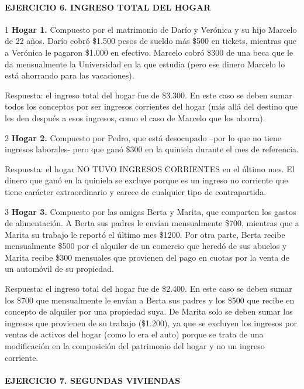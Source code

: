\documentclass[
  openany]{book}
\begin{document}
\hypertarget{ejercicio-6.-ingreso-total-del-hogar-1}{%
\paragraph{\texorpdfstring{\textbf{EJERCICIO 6. INGRESO TOTAL DEL HOGAR}}{EJERCICIO 6. INGRESO TOTAL DEL HOGAR}}\label{ejercicio-6.-ingreso-total-del-hogar-1}}

1 \textbf{Hogar 1.} Compuesto por el matrimonio de Darío y Verónica y su hijo Marcelo de 22 años. Darío cobró \$1.500 pesos de sueldo más \$500 en tickets, mientras que a Verónica le pagaron \$1.000 en efectivo. Marcelo cobró \$300 de una beca que le da mensualmente la Universidad en la que estudia (pero ese dinero Marcelo lo está ahorrando para las vacaciones).

Respuesta: el ingreso total del hogar fue de \$3.300. En este caso se deben sumar todos los conceptos por ser ingresos corrientes del hogar (más allá del destino que les den después a esos ingresos, como el caso de Marcelo que los ahorra).

2 \textbf{Hogar 2.} Compuesto por Pedro, que está desocupado --por lo que no tiene ingresos laborales- pero que ganó \$300 en la quiniela durante el mes de referencia.

Respuesta: el hogar NO TUVO INGRESOS CORRIENTES en el último mes. El dinero que ganó en la quiniela se excluye porque es un ingreso no corriente que tiene carácter extraordinario y carece de cualquier tipo de contrapartida.

3 \textbf{Hogar 3.} Compuesto por las amigas Berta y Marita, que comparten los gastos de alimentación. A Berta sus padres le envían mensualmente \$700, mientras que a Marita su trabajo le reportó el último mes \$1200. Por otra parte, Berta recibe mensualmente \$500 por el alquiler de un comercio que heredó de sus abuelos y Marita recibe \$300 mensuales que provienen del pago en cuotas por la venta de un automóvil de su propiedad.

Respuesta: el ingreso total del hogar fue de \$2.400. En este caso se deben sumar los \$700 que mensualmente le envían a Berta sus padres y los \$500 que recibe en concepto de alquiler por una propiedad suya. De Marita solo se deben sumar los ingresos que provienen de su trabajo (\$1.200), ya que se excluyen los ingresos por ventas de activos del hogar (como lo era el auto) porque se trata de una modificación en la composición del patrimonio del hogar y no un ingreso corriente.

\hypertarget{ejercicio-7.-segundas-viviendas-1}{%
\paragraph{\texorpdfstring{\textbf{EJERCICIO 7. SEGUNDAS VIVIENDAS}}{EJERCICIO 7. SEGUNDAS VIVIENDAS}}\label{ejercicio-7.-segundas-viviendas-1}}
\end{document}
